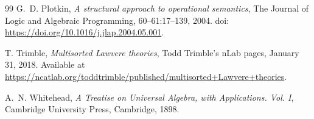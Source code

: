 \documentclass[11pt]{article}
\begin{document}
\begin{thebibliography}{99}
G.~D. Plotkin,
\emph{A structural approach to operational semantics},
The Journal of Logic and Algebraic Programming,
60--61:17--139, 2004.
doi: \url{https://doi.org/10.1016/j.jlap.2004.05.001}.

T. Trimble,
\emph{Multisorted Lawvere theories},
Todd Trimble's nLab pages, January 31, 2018.
Available at \url{https://ncatlab.org/toddtrimble/published/multisorted+Lawvere+theories}.

A.~N. Whitehead,
\emph{A Treatise on Universal Algebra, with Applications. Vol. I},
Cambridge University Press, Cambridge, 1898.
\end{thebibliography}
\end{document}
